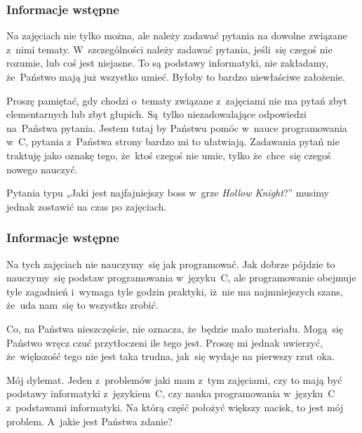 \documentclass[10pt,t]{beamer}
\begin{document}
\begin{frame}
  \frametitle{Informacje wstępne}


  Na zajęciach nie tylko można, ale \alert{należy} zadawać pytania
  na dowolne związane z~nimi tematy. W~szczególności
  \alert{należy} zadawać pytania, jeśli~się czegoś nie rozumie, lub coś
  jest niejasne. To są podstawy informatyki, \alert{nie} zakładamy,
  że~Państwo mają już wszystko umieć. Byłoby to bardzo niewłaściwe
  założenie.

  Proszę pamiętać, gdy chodzi o~tematy związane z~zajęciami
  \alert{nie} ma pytań zbyt elementarnych lub zbyt głupich. Są~tylko
  niezadowalające odpowiedzi na~Państwa pytania. Jestem tutaj by Państwu
  pomóc w~nauce programowania w~C, pytania z~Państwa strony bardzo mi to
  ułatwiają. Zadawania pytań nie traktuję jako oznakę tego, że~ktoś czegoś
  nie umie, tylko że~chce~się czegoś nowego nauczyć.

  Pytania typu „Jaki jest najfajniejszy boss w~grze \textit{Hollow
    Knight}?” musimy jednak zostawić na czas po zajęciach.

\end{frame}





\begin{frame}
  \frametitle{Informacje wstępne}


  Na tych zajęciach \alert{nie} nauczymy~się jak programować. Jak dobrze
  pójdzie to nauczymy~się podstaw programowania w~języku~C, ale
  programowanie obejmuje tyle zagadnień i~wymaga tyle godzin praktyki,
  iż~nie ma najmniejszych szans, że~uda nam~się to wszystko zrobić.

  Co, na Państwa nieszczęście, nie oznacza, że~będzie mało materiału.
  Mogą~się Państwo wręcz czuć przytłoczeni ile tego jest. Proszę mi jednak
  uwierzyć, że~większość tego nie jest taka trudna, jak~się wydaje na
  pierwszy rzut oka.

  \alert{Mój dylemat.} Jeden z~problemów jaki mam z~tym zajęciami, czy to
  mają być \alert{podstawy informatyki} z~językiem~C, czy \alert{nauka
    programowania w~języku~C} z~podstawami informatyki. Na którą część
  położyć większy nacisk, to jest mój problem. A~jakie jest Państwa zdanie?

\end{frame}
\end{document}
